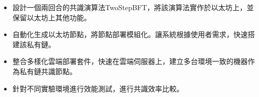 \begin{itemize}%
\item 設計一個兩回合的共識演算法TwoStepBFT，將該演算法實作於以太坊上，並保留以太坊上其他功能。
\item 自動化生成以太坊節點，將節點部署模組化。讓系統根據使用者需求，快速搭建該私有鏈。
\item 整合多樣化雲端部署套件，快速在雲端伺服器上，建立多台環境一致的機器作為私有鏈共識節點。
\item 針對不同實驗環境進行效能測試，進行共識效率比較。 
\end{itemize}





